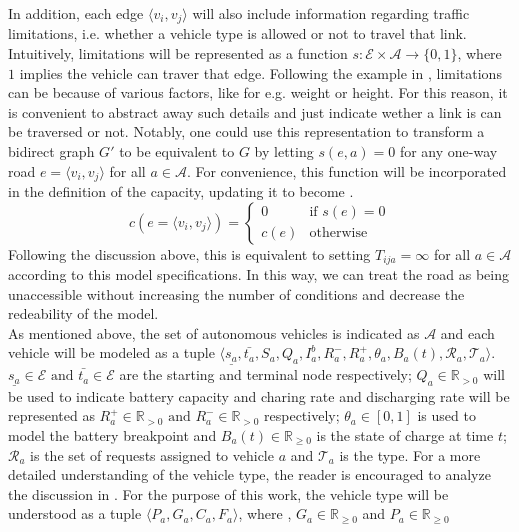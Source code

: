 In addition, each edge $\langle v_i, v_j \rangle$ will also include information regarding traffic limitations, i.e. whether a vehicle type is allowed or not to travel that link. Intuitively, limitations will be represented as a function $s: \mathcal{E} \times \mathcal{A} \rightarrow\{0,1\}$, where $1$ implies the vehicle can traver that edge. Following the example in \cite{project_thesis}, limitations can be because of various factors, like for e.g. weight or height. For this reason, it is convenient to abstract away such details and just indicate wether a link is can be traversed or not. Notably, one could use this representation to transform a bidirect graph $G'$ to be equivalent to $G$ by letting $s(e,a) = 0$ for any one-way road $e = \langle v_i, v_j \rangle$ for all $a \in \mathcal{A}$. For convenience, this function will be incorporated in the definition of the capacity, updating it to become . 
\begin{equation}
	c(e = \langle v_i, v_j \rangle) = 
	\begin{cases}
		0 & \text{if } s(e) = 0 \\
		c(e) & \text{otherwise}
	\end{cases}
	\label{eq:capacity}
\end{equation}
Following the discussion above, this is equivalent to setting $T_{ija} = \infty$ for all $a \in \mathcal{A}$ according to this model specifications. In this way, we can treat the road as being unaccessible without increasing the number of conditions and decrease the redeability of the model. \\
As mentioned above, the set of autonomous vehicles is indicated as $\mathcal{A}$ and each vehicle will be modeled as a tuple $\langle \underline{s_a},\bar{t_a}, S_a, Q_a, I^b_a, R^-_a, R^+_a, \theta_a, B_a(t),\mathcal{R}_a, \mathcal{T}_a \rangle$. $\underline{s_a}\in \mathcal{E} \text{ and } \bar{t_a}\in \mathcal{E}$ are the starting and terminal node respectively; $Q_a \in \mathbb{R}_{>0}$ will be used to indicate battery capacity and charing rate and discharging rate will be represented as  $R^+_a \in \mathbb{R}_{>0}\text{ and } R^-_a\in \mathbb{R}_{>0}$ respectively; $\theta_a \in [0,1]$ is used to model the battery breakpoint and $B_a(t)\in \mathbb{R}_{\ge0}$ is the state of charge at time $t$; $\mathcal{R}_a$ is the set of requests assigned to vehicle $a$ and $\mathcal{T}_a$ is the type. For a more detailed understanding of the vehicle type, the reader is encouraged to analyze the discussion in \cite{project_thesis}. For the purpose of this work, the vehicle type will be understood as a tuple $\langle P_a, G_a, C_a, F_a \rangle$, where , $G_a \in \mathbb{R}_{\ge0}$ and $P_a \in \mathbb{R}_{\ge0}$

